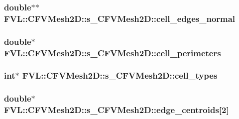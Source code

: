 \label{da/d6f/structFVL_1_1CFVMesh2D_1_1s__CFVMesh2D_a708e8512deb92f5502d4d30441a9d34e}
\hypertarget{structFVL_1_1CFVMesh2D_1_1s__CFVMesh2D_a86b664ea19f349d9560b02deb0058f5d}{
\subsubsection[{cell\_\-edges\_\-normal}]{\setlength{\rightskip}{0pt plus 5cm}double$\ast$$\ast$ {\bf FVL::CFVMesh2D::s\_\-CFVMesh2D::cell\_\-edges\_\-normal}}}
\label{da/d6f/structFVL_1_1CFVMesh2D_1_1s__CFVMesh2D_a86b664ea19f349d9560b02deb0058f5d}
\hypertarget{structFVL_1_1CFVMesh2D_1_1s__CFVMesh2D_a7dd44790f0dbfbb2a7e516c73bea9e0f}{
\subsubsection[{cell\_\-perimeters}]{\setlength{\rightskip}{0pt plus 5cm}double$\ast$ {\bf FVL::CFVMesh2D::s\_\-CFVMesh2D::cell\_\-perimeters}}}
\label{da/d6f/structFVL_1_1CFVMesh2D_1_1s__CFVMesh2D_a7dd44790f0dbfbb2a7e516c73bea9e0f}
\hypertarget{structFVL_1_1CFVMesh2D_1_1s__CFVMesh2D_ad14f92db99fb4e9eeb32130a0040bae1}{
\subsubsection[{cell\_\-types}]{\setlength{\rightskip}{0pt plus 5cm}int$\ast$ {\bf FVL::CFVMesh2D::s\_\-CFVMesh2D::cell\_\-types}}}
\label{da/d6f/structFVL_1_1CFVMesh2D_1_1s__CFVMesh2D_ad14f92db99fb4e9eeb32130a0040bae1}
\hypertarget{structFVL_1_1CFVMesh2D_1_1s__CFVMesh2D_ad9a605d4840c19468d8a4b15f8588cf2}{
\subsubsection[{edge\_\-centroids}]{\setlength{\rightskip}{0pt plus 5cm}double$\ast$ {\bf FVL::CFVMesh2D::s\_\-CFVMesh2D::edge\_\-centroids}\mbox{[}2\mbox{]}}}
